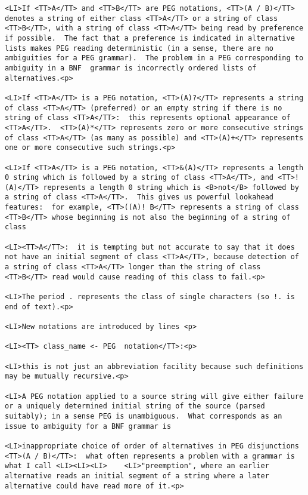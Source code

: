 \documentclass[12pt]{article}
\begin{document}
\begin{lstlisting}
<LI>If <TT>A</TT> and <TT>B</TT> are PEG notations, <TT>(A / B)</TT> denotes a string of either class <TT>A</TT> or a string of class <TT>B</TT>, with a string of class <TT>A</TT> being read by preference if possible.  The fact that a preference is indicated in alternative lists makes PEG reading deterministic (in a sense, there are no ambiguities for a PEG grammar).  The problem in a PEG corresponding to ambiguity in a BNF  grammar is incorrectly ordered lists of alternatives.<p>

<LI>If <TT>A</TT> is a PEG notation, <TT>(A)?</TT> represents a string of class <TT>A</TT> (preferred) or an empty string if there is no string of class <TT>A</TT>:  this represents optional appearance of <TT>A</TT>.  <TT>(A)*</TT> represents zero or more consecutive strings of class <TT>A</TT> (as many as possible) and <TT>(A)+</TT> represents one or more consecutive such strings.<p>

<LI>If <TT>A</TT> is a PEG notation, <TT>&(A)</TT> represents a length 0 string which is followed by a string of class <TT>A</TT>, and <TT>!(A)</TT> represents a length 0 string which is <B>not</B> followed by a string of class <TT>A</TT>.  This gives us powerful lookahead features:  for example, <TT>((A)! B</TT> represents a string of class <TT>B</TT> whose beginning is not also the beginning of a string of class

<LI><TT>A</TT>:  it is tempting but not accurate to say that it does not have an initial segment of class <TT>A</TT>, because detection of a string of class <TT>A</TT> longer than the string of class <TT>B</TT> read would cause reading of this class to fail.<p>

<LI>The period . represents the class of single characters (so !. is end of text).<p>

<LI>New notations are introduced by lines <p>

<LI><TT> class_name <- PEG  notation</TT>:<p>

<LI>this is not just an abbreviation facility because such definitions may be mutually recursive.<p>

<LI>A PEG notation applied to a source string will give either failure or a uniquely determined initial string of the source (parsed suitably); in a sense PEG is unambiguous.  What corresponds as an issue to ambiguity for a BNF grammar is

<LI>inappropriate choice of order of alternatives in PEG disjunctions <TT>(A / B)</TT>:  what often represents a problem with a grammar is what I call <LI><LI><LI>    <LI>"preemption", where an earlier alternative reads an initial segment of a string where a later alternative could have read more of it.<p>


\end{lstlisting}
\end{document}
